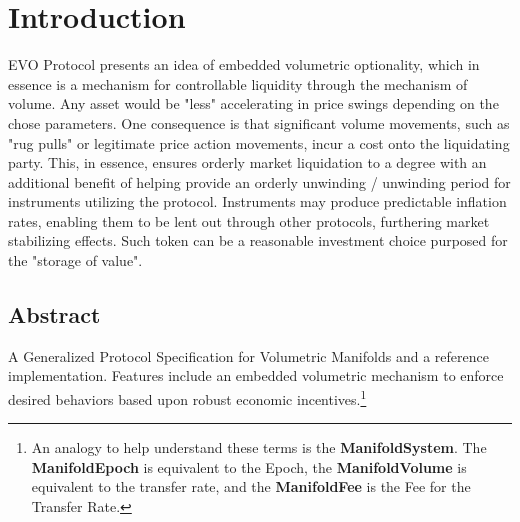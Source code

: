 


\chapter{Introduction}\label{sec:introduction}

EVO Protocol presents an idea of embedded volumetric optionality, which in essence is a mechanism for controllable liquidity through the mechanism of volume. Any asset would be "less" accelerating in price swings depending on the chose parameters. One consequence is that significant volume movements, such as "rug pulls" or legitimate price action movements, incur a cost onto the liquidating party. This, in essence, ensures orderly market liquidation to a degree with an additional benefit of helping provide an orderly unwinding / unwinding period for instruments utilizing the protocol. Instruments may produce predictable inflation rates, enabling them to be lent out through other protocols, furthering market stabilizing effects. Such token can be a reasonable investment choice purposed for the "storage of value".

\section{Abstract}\label{sec:preamble}
A Generalized Protocol Specification for Volumetric Manifolds and a reference implementation. Features include an embedded 
volumetric mechanism to enforce desired behaviors
based upon robust economic incentives.\footnote{An analogy to help understand these terms is the \textbf{ManifoldSystem}. The \textbf{ManifoldEpoch} is equivalent to the Epoch,
the \textbf{ManifoldVolume} is equivalent to the
transfer rate, and the \textbf{ManifoldFee} is the
Fee for the Transfer Rate.}

